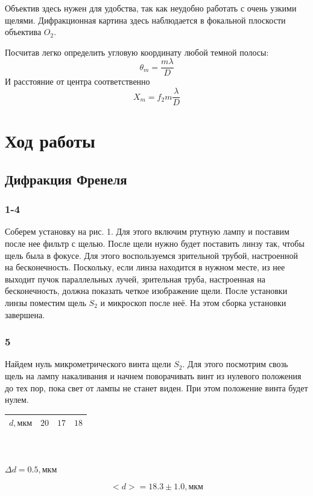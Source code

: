\documentclass[a4paper, 12pt]{article}%
\begin{document}
Объектив здесь нужен для удобства, так как неудобно работать с очень узкими щелями. Дифракционная картина здесь наблюдается в фокальной плоскости объектива $O_2$.

Посчитав легко определить угловую координату любой темной полосы:
\begin{equation}
\theta_m = \frac{m \lambda}{D}
\end{equation}
И расстояние от центра соответственно
\begin{equation}
X_m = f_2m\frac{\lambda}{D}
\end{equation}
\section*{Ход работы}
\subsection*{Дифракция Френеля}
\subsubsection*{1-4}
Соберем установку на рис. 1. Для этого включим ртутную лампу и поставим после нее фильтр с щелью. После щели нужно будет поставить линзу так, чтобы щель была в фокусе. Для этого воспользуемся зрительной трубой, настроенной на бесконечность. Поскольку, если линза находится в нужном месте, из нее выходит пучок параллельных лучей, зрительная труба, настроенная на бесконечность, должна показать четкое изображение щели. После установки линзы поместим щель $S_2$ и микроскоп после неё. На этом сборка установки завершена.
\subsubsection*{5}
Найдем нуль микрометрического винта щели $S_2$. Для этого посмотрим свозь щель на лампу накаливания и начнем поворачивать винт из нулевого положения до тех пор, пока свет от лампы не станет виден. При этом положение винта будет нулем.

\begin{center}
\begin{tabular}{|c|c|c|c|}
\hline
$d, \text{мкм}$&$20$&$17$&$18$\\ \hline
\end{tabular}\\~\\
$\Delta d = 0.5, \text{мкм}$
\end{center}
\[<d> = 18.3 \pm 1.0, \text{мкм}\]
\end{document}
